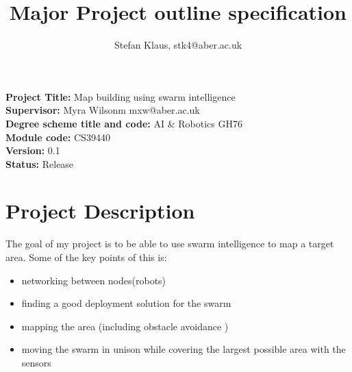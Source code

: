 \documentclass[10pt,a4paper]{article}
\author{Stefan Klaus, stk4@aber.ac.uk}
\title{Major Project outline specification }
\begin{document}

\maketitle
\begin{flushleft}
\textbf{Project Title:} Map building using swarm intelligence \\[3ex]
\textbf{Supervisor:} Myra Wilsonm mxw@aber.ac.uk\\[3ex]
\textbf{Degree scheme title and code:} AI \& Robotics GH76\\[3ex]
\textbf{Module code:} CS39440\\[3ex]
\textbf{Version:} 0.1\\[3ex]
\textbf{Status:} Release\\
\newpage
\section{Project Description }
The goal of my project is to be able to use swarm intelligence to map a target area. Some of the key points of this is:

\begin{itemize}
\item networking between nodes(robots)
\item finding a good deployment solution for the swarm
\item mapping the area (including obstacle avoidance )
\item moving the swarm in unison while covering the largest possible area with the sensors

\newpage
\nocite{*}


\end{itemize}
\end{flushleft}
\end{document}
